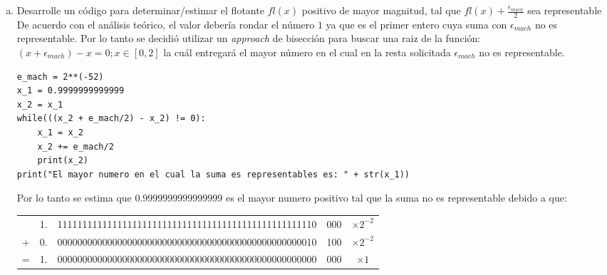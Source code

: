 \documentclass[10pt]{article}
\begin{document}
\begin{enumerate}[a)]
\item Desarrolle un código para determinar/estimar el flotante $fl(x)$ positivo de mayor magnitud, tal que $fl(x) + \frac{\epsilon_{mach}}{2}$ sea representable\\
De acuerdo con el análisis teórico, el valor debería rondar el número $1$ ya que es el primer entero cuya suma con $\epsilon_{mach}$ no es representable. Por lo tanto se decidió utilizar un \textit{approach} de bisección para buscar una raiz de la función: $(x + \epsilon_{mach}) - x = 0 ; x \in [0, 2]$ la cuál entregará el mayor número en el cual en la resta solicitada $\epsilon_{mach}$ no es representable.
\begin{verbatim}
e_mach = 2**(-52)
x_1 = 0.9999999999999
x_2 = x_1
while(((x_2 + e_mach/2) - x_2) != 0):
	x_1 = x_2
	x_2 += e_mach/2
	print(x_2)
print("El mayor numero en el cual la suma es representables es: " + str(x_1))
\end{verbatim}
Por lo tanto se estima que $0.9999999999999999$ es el mayor numero positivo tal que la suma no es representable debido a que:
\begin{center}
\begin{tabular}{c c | c | c | c}
 \cline{3-4}
 & 1. & 1111111111111111111111111111111111111111111111111110 & 000 & $\times 2^{-2}$\\
 \cline{3-4}
 + & 0. & 0000000000000000000000000000000000000000000000000010 & 100 & $\times 2^{-2}$\\
 \cline{1-5}
 = & 1. & 0000000000000000000000000000000000000000000000000000 & 000 & $\times 1$\\
 \cline{3-4}
\end{tabular}
\end{center}
\end{enumerate}
\end{document}

